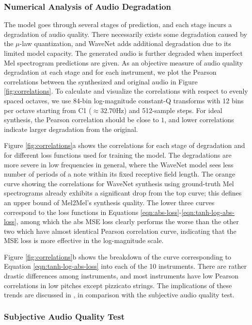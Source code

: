 \subsubsection{Numerical Analysis of Audio Degradation}

The model goes through several stages of prediction, and each stage incurs a degradation of audio quality.
There necessarily exists some degradation caused by the $\mu$-law quantization, and WaveNet adds additional degradation due to its limited model capacity.
The generated audio is further degraded when imperfect Mel spectrogram predictions are given.
As an objective measure of audio quality degradation at each stage and for each instrument, we plot the Pearson correlations between the synthesized and original audio in Figure \ref{fig:correlations}.
To calculate and visualize the correlations with respect to evenly spaced octaves, we use 84-bin log-magnitude constant-Q transforms with 12 bins per octave starting from C1 ($\approx 32.70 \textrm{Hz}$) and 512-sample steps.
For ideal synthesis, the Pearson correlation should be close to $1$, and lower correlations indicate larger degradation from the original.

Figure \ref{fig:correlations}a shows the correlations for each stage of degradation and for different loss functions used for training the model.
The degradations are more severe in low frequencies in general, where the WaveNet model sees less number of periods of a note within its fixed receptive field length.
The orange curve showing the correlations for WaveNet synthesis using ground-truth Mel spectrograms already exhibits a significant drop from the top curve; this defines an upper bound of Mel2Mel's synthesis quality.
The lower three curves correspond to the loss functions in Equations \ref{eqn:abs-loss}-\ref{eqn:tanh-log-abs-loss}, among which the abs MSE loss clearly performs the worse than the other two which have almost identical Pearson correlation curve, indicating that the MSE loss is more effective in the log-magnitude scale.

Figure \ref{fig:correlations}b shows the breakdown of the curve corresponding to Equation \ref{eqn:tanh-log-abs-loss} into each of the 10 instruments.
There are rather drastic differences among instruments, and most instruments have low Pearson correlations in low pitches except pizzicato strings.
The implications of these trends are discussed in \cite{kim2019synthesis}, in comparison with the subjective audio quality test.

\iffalse
\subsubsection{Subjective Audio Quality Test}\label{sec:subjective}

